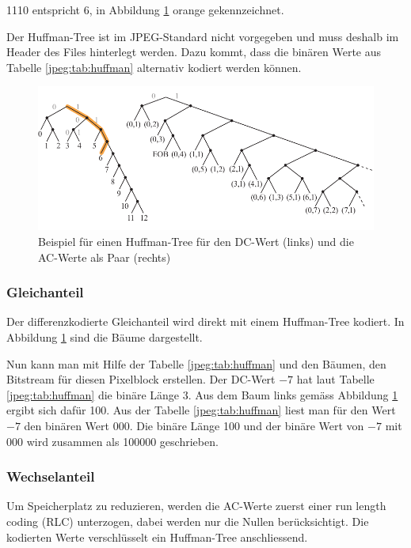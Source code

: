 \begin{beispiel}
1110 entspricht 6, in Abbildung \ref{jpeg:fig:huffman} orange gekennzeichnet.
\end{beispiel}

Der Huffman-Tree ist im JPEG-Standard nicht vorgegeben und muss deshalb im Header des Files hinterlegt werden.
Dazu kommt, dass die binären Werte aus Tabelle \ref{jpeg:tab:huffman} alternativ kodiert werden können.

\begin{figure}
    \centering
    \includegraphics[width=\textwidth]{papers/jpeg/pictures/huffman.pdf}
    \caption{Beispiel für einen Huffman-Tree für den DC-Wert (links) \cite{jpeg:dccomponentyoutube} und die AC-Werte als Paar (rechts) \cite{jpeg:accomponentsyoutube}
        \label{jpeg:fig:huffman}}
\end{figure}

\subsubsection{Gleichanteil
\label{jpeg:subsubsection:gleichanteil}}
Der differenzkodierte Gleichanteil wird direkt mit einem Huffman-Tree kodiert.
%
In Abbildung \ref{jpeg:fig:huffman} sind die Bäume dargestellt.

Nun kann man mit Hilfe der Tabelle \ref{jpeg:tab:huffman} und den Bäumen, den Bitstream für diesen Pixelblock erstellen.
Der DC-Wert \(-7\) hat laut Tabelle \ref{jpeg:tab:huffman} die binäre Länge 3.
Aus dem Baum links gemäss Abbildung \ref{jpeg:fig:huffman} ergibt sich dafür 100.
Aus der Tabelle \ref{jpeg:tab:huffman} liest man für den Wert \(-7\) den binären Wert 000.
Die binäre Länge 100 und der binäre Wert von \(-7\) mit 000 wird zusammen als 100000 geschrieben.

\subsubsection{Wechselanteil
\label{jpeg:subsubsection:wechselanteil}}
%
Um Speicherplatz zu reduzieren, werden die AC-Werte zuerst einer run length coding (RLC) unterzogen, dabei werden nur die Nullen berücksichtigt. 
%
Die kodierten Werte verschlüsselt ein Huffman-Tree anschliessend.

